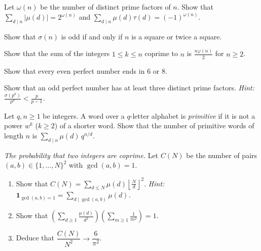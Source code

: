 \begin{exercise}[$\star$]\label{ex:muid}
Let $\omega(n)$ be the number of distinct prime factors of $n$. Show that $\sum_{d\mid n}|\mu(d)|=2^{\omega(n)}$ and $\sum_{d\mid n}\mu(d)\tau(d)=(-1)^{\omega(n)}$.
\end{exercise}

\begin{exercise}[$\star\star$]\label{ex:sigmaodd}
Show that $\sigma(n)$ is odd if and only if $n$ is a square or twice a square.
\end{exercise}

\begin{exercise}[$\star\star$]\label{ex:coprimesum}
Show that the sum of the integers $1\le k\le n$ coprime to $n$ is $\frac{n\varphi(n)}2$ for $n\ge2$.
\end{exercise}

\begin{exercise}[$\star\star$]\label{ex:even}
Show that every even perfect number ends in $6$ or $8$.
\end{exercise}

\begin{exercise}[$\star\star$]\label{ex:oddperfect}
Show that an odd perfect number has at least three distinct prime factors. \emph{Hint: $\frac{\sigma(p^a)}{p^a}<\frac p{p-1}$.}
\end{exercise}

\begin{exercise}[$\star\star$]\label{ex:primitive}
Let $q,n\ge1$ be integers. A word over a $q$-letter alphabet is \emph{primitive} if it is not a power $w^k$ ($k\ge2$) of a shorter word. Show that the number of primitive words of length $n$ is $\sum_{d\mid n}\mu(d)\,q^{n/d}$.
\end{exercise}

\begin{exercise}[$\star\star\star$]\label{ex:coprimeprob}
\emph{The probability that two integers are coprime.} Let $C(N)$ be the number of pairs $(a,b)\in\{1,\dots,N\}^2$ with $\gcd(a,b)=1$.
\begin{enumerate}[label=(\alph*)]
\item Show that $C(N)=\sum_{d\le N}\mu(d)\left\lfloor\frac Nd\right\rfloor^2$. \emph{Hint: $\mathbf 1_{\gcd(a,b)=1}=\sum_{d\mid\gcd(a,b)}\mu(d)$.}
\item Show that $\left(\sum_{d\ge1}\frac{\mu(d)}{d^2}\right)\left(\sum_{m\ge1}\frac1{m^2}\right)=1$.
\item Deduce that $\dfrac{C(N)}{N^2}\to\dfrac6{\pi^2}$.
\end{enumerate}
\end{exercise}

